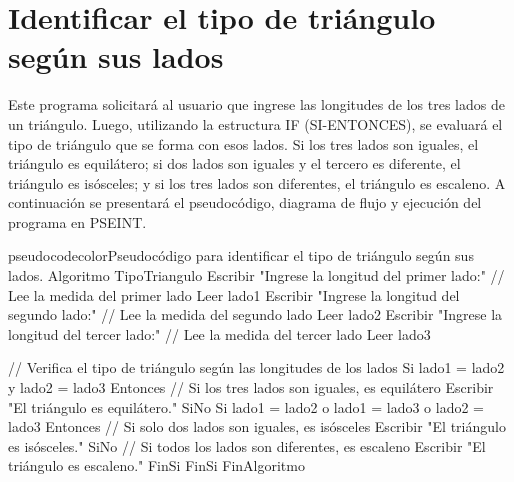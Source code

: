 
\section{Identificar el tipo de triángulo según sus lados}

Este programa solicitará al usuario que ingrese las longitudes de los tres lados de un triángulo. Luego, utilizando la estructura IF (SI-ENTONCES), se evaluará el tipo de triángulo que se forma con esos lados. Si los tres lados son iguales, el triángulo es equilátero; si dos lados son iguales y el tercero es diferente, el triángulo es isósceles; y si los tres lados son diferentes, el triángulo es escaleno. A continuación se presentará el pseudocódigo, diagrama de flujo y ejecución del programa en PSEINT.

\begin{sourcecode}{pseudocodecolor}{Pseudocódigo para identificar el tipo de triángulo según sus lados.}
Algoritmo TipoTriangulo
    Escribir "Ingrese la longitud del primer lado:"
    // Lee la medida del primer lado
    Leer lado1
    Escribir "Ingrese la longitud del segundo lado:"
    // Lee la medida del segundo lado
    Leer lado2
    Escribir "Ingrese la longitud del tercer lado:"
    // Lee la medida del tercer lado
    Leer lado3
    
    // Verifica el tipo de triángulo según las longitudes de los lados
    Si lado1 = lado2 y lado2 = lado3 Entonces
        // Si los tres lados son iguales, es equilátero
        Escribir "El triángulo es equilátero."
    SiNo Si lado1 = lado2 o lado1 = lado3 o lado2 = lado3 Entonces
			// Si solo dos lados son iguales, es isósceles
			Escribir "El triángulo es isósceles."
		SiNo
			// Si todos los lados son diferentes, es escaleno
			Escribir "El triángulo es escaleno."
		FinSi
	FinSi
FinAlgoritmo
\end{sourcecode}



